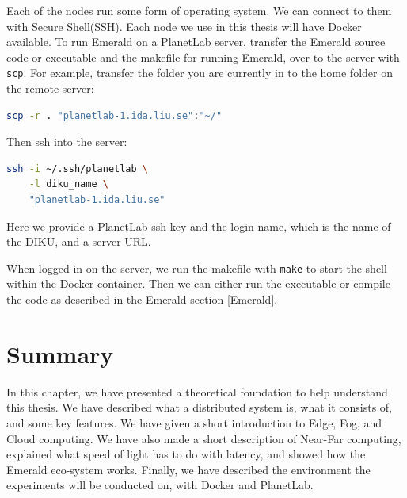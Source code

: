 Each of the nodes run some form of operating system. We can connect to them with Secure Shell(SSH). Each node we use in this thesis will have Docker available. To run Emerald on a PlanetLab server, transfer the Emerald source code or executable and the makefile for running Emerald, over to the server with \verb|scp|. For example, transfer the folder you are currently in to the home folder on the remote server:
\begin{lstlisting}[language=Bash]
scp -r . "planetlab-1.ida.liu.se":"~/"
\end{lstlisting}
Then ssh into the server: 
\begin{lstlisting}[language=Bash]
ssh -i ~/.ssh/planetlab \
    -l diku_name \
    "planetlab-1.ida.liu.se"
\end{lstlisting}
Here we provide a PlanetLab ssh key and the login name, which is the name of the DIKU, and a server URL.

When logged in on the server, we run the makefile with \verb|make| to start the shell within the Docker container. Then we can either run the executable or compile the code as described in the Emerald section \ref{Emerald}.



\section{Summary}
In this chapter, we have presented a theoretical foundation to help understand this thesis. We have described what a distributed system is, what it consists of, and some key features. We have given a short introduction to Edge, Fog, and Cloud computing. We have also made a short description of Near-Far computing, explained what speed of light has to do with latency, and showed how the Emerald eco-system works. Finally, we have described the environment the experiments will be conducted on, with Docker and PlanetLab.

